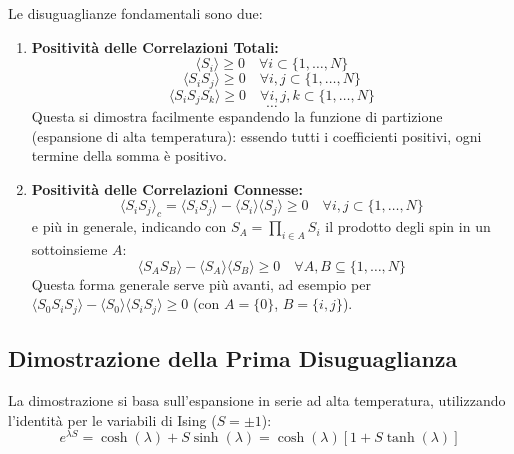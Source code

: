 Le disuguaglianze fondamentali sono due:
\begin{enumerate}
    \item \textbf{Positività delle Correlazioni Totali:}
    \begin{equation}
    \langle S_i \rangle \ge 0 \quad \forall i \subset \{1, \dots, N\}
    \end{equation}
    \begin{equation}
    \langle S_i S_j\rangle \ge 0 \quad \forall i, j \subset \{1, \dots, N\}
    \end{equation}
     \begin{equation}
    \langle S_i S_j S_k\rangle \ge 0 \quad \forall i, j, k \subset \{1, \dots, N\}
    \end{equation}
     \begin{equation*}
    \dots 
    \end{equation*}
    Questa si dimostra facilmente espandendo la funzione di partizione (espansione di alta temperatura): essendo tutti i coefficienti positivi, ogni termine della somma è positivo.
    
    \item \textbf{Positività delle Correlazioni Connesse:}
    \begin{equation}
    \langle S_i S_j \rangle_c = \langle S_i S_j \rangle - \langle S_i \rangle \langle S_j \rangle \ge 0 \quad \forall i, j \subset \{1, \dots, N\}
    \end{equation}
    e più in generale, indicando con $S_A = \prod_{i \in A} S_i$ il prodotto degli spin in un sottoinsieme $A$:
    \begin{equation}
    \langle S_A S_B \rangle - \langle S_A \rangle \langle S_B \rangle \ge 0 \quad \forall A, B \subseteq \{1, \dots, N\}
    \end{equation}
    Questa forma generale serve più avanti, ad esempio per $\langle S_0 S_i S_j \rangle - \langle S_0 \rangle \langle S_i S_j \rangle \ge 0$ (con $A = \{0\}$, $B = \{i,j\}$).
\end{enumerate}

\subsection{Dimostrazione della Prima Disuguaglianza}

La dimostrazione si basa sull'espansione in serie ad alta temperatura, utilizzando l'identità per le variabili di Ising ($S = \pm 1$):
\begin{equation}
e^{\lambda S} = \cosh(\lambda) + S \sinh(\lambda) = \cosh(\lambda) [1 + S \tanh(\lambda)]
\end{equation}

